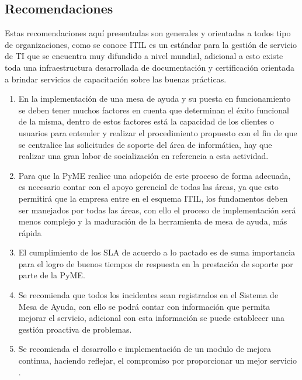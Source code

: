 \subsection{Recomendaciones}
Estas recomendaciones aquí presentadas son generales y orientadas a todos tipo
de organizaciones, como se conoce ITIL es un estándar para la gestión de servicio
de TI que se encuentra muy difundido a nivel mundial, adicional a esto existe toda
una infraestructura desarrollada de documentación y certificación orientada a
brindar servicios de capacitación sobre las buenas prácticas.
\begin{enumerate}[1.]
	\item En la implementación de una mesa de ayuda y su puesta en
	funcionamiento se deben tener muchos factores en cuenta que determinan
	el éxito funcional de la misma, dentro de estos factores está la capacidad
	de los clientes o usuarios para entender y realizar el procedimiento
	propuesto con el fin de que se centralice las solicitudes de soporte del área
	de informática, hay que realizar una gran labor de socialización en
	referencia a esta actividad.
	\item Para que la PyME realice una adopción de este proceso de forma adecuada,
	es necesario contar con el apoyo gerencial de todas las áreas, ya que esto
	permitirá que la empresa entre en el esquema ITIL, los fundamentos deben
	ser manejados por todas las áreas, con ello el proceso de implementación
	será menos complejo y la maduración de la herramienta de mesa de ayuda,
	más rápida
	\item El cumplimiento de los SLA de acuerdo a lo pactado es de suma
	importancia para el logro de buenos tiempos de respuesta en la prestación
	de soporte por parte de la PyME.
	\item Se recomienda que todos los incidentes sean registrados en el Sistema de
	Mesa de Ayuda, con ello se podrá contar con información que permita
	mejorar el servicio, adicional con esta información se puede establecer una
	gestión proactiva de problemas.
	\item Se recomienda el desarrollo e implementación de un modulo de mejora continua, haciendo reflejar, el compromiso por proporcionar un mejor servicio .
\end{enumerate}